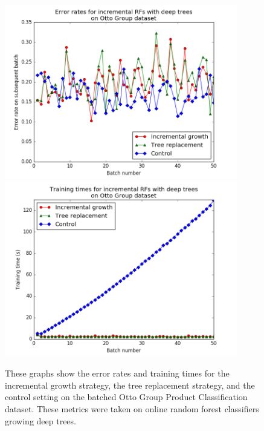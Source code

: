 \begin{figure}
  \centering
  \includegraphics[width=4.0in]{otto3}\\
  \includegraphics[width=4.0in]{otto4}
  \caption{These graphs show the error rates and training times for the
incremental growth strategy, the tree replacement strategy, and the control
setting on the batched Otto Group Product Classification dataset. These metrics
were taken on online random forest classifiers growing deep trees.}
  \label{fig:otto1}
\end{figure}

